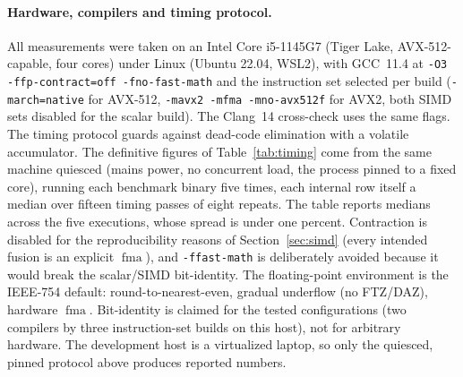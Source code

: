 \documentclass[11pt]{article}
\begin{document}
\paragraph{Hardware, compilers and timing protocol.}
All measurements were taken on an Intel Core i5-1145G7 (Tiger Lake, AVX-512-capable, four cores) under Linux (Ubuntu 22.04, WSL2), with GCC~11.4 at \texttt{-O3 -ffp-contract=off -fno-fast-math} and the instruction set selected per build (\texttt{-march=native} for AVX-512, \texttt{-mavx2 -mfma -mno-avx512f} for AVX2, both SIMD sets disabled for the scalar build). The Clang~14 cross-check uses the same flags. The timing protocol guards against dead-code elimination with a volatile accumulator. The definitive figures of Table~\ref{tab:timing} come from the same machine quiesced (mains power, no concurrent load, the process pinned to a fixed core), running each benchmark binary five times, each internal row itself a median over fifteen timing passes of eight repeats. The table reports medians across the five executions, whose spread is under one percent. Contraction is disabled for the reproducibility reasons of Section~\ref{sec:simd} (every intended fusion is an explicit $\operatorname{fma}$), and \texttt{-ffast-math} is deliberately avoided because it would break the scalar/SIMD bit-identity. The floating-point environment is the IEEE-754 default: round-to-nearest-even, gradual underflow (no FTZ/DAZ), hardware $\operatorname{fma}$. Bit-identity is claimed for the tested configurations (two compilers by three instruction-set builds on this host), not for arbitrary hardware. The development host is a virtualized laptop, so only the quiesced, pinned protocol above produces reported numbers.
\end{document}
